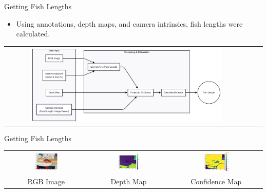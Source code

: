 \begin{frame}{Getting Fish Lengths}
    \begin{itemize}
        \item Using annotations, depth maps, and camera intrinsics, fish lengths were calculated.
    \end{itemize}
    \vspace{1em}
    \centering
    \begin{tabular}{ccc}
        \includegraphics[width=0.8\textwidth]{images/length_measurement_pipeline.png} &
    \end{tabular}
\end{frame}

\begin{frame}{Getting Fish Lengths}
    \centering
    \begin{tabular}{ccc}
        \includegraphics[width=0.3\textwidth]{images/rgb1.png} &
        \includegraphics[width=0.3\textwidth]{images/depth1.png} &
        \includegraphics[width=0.3\textwidth]{images/confidence1.png} \\
        \small RGB Image & \small Depth Map & \small Confidence Map \\
    \end{tabular}
\end{frame}

